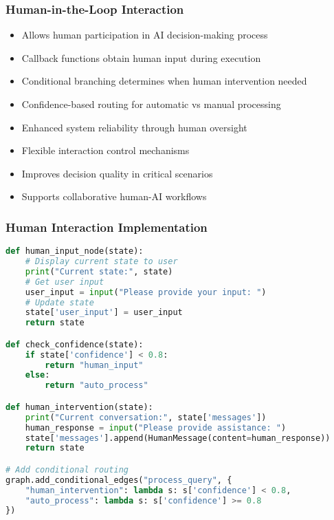 \begin{frame}[fragile]\frametitle{Human-in-the-Loop Interaction}
      \begin{itemize}
        \item Allows human participation in AI decision-making process
        \item Callback functions obtain human input during execution
        \item Conditional branching determines when human intervention needed
        \item Confidence-based routing for automatic vs manual processing
        \item Enhanced system reliability through human oversight
        \item Flexible interaction control mechanisms
        \item Improves decision quality in critical scenarios
        \item Supports collaborative human-AI workflows
      \end{itemize}
\end{frame}

\begin{frame}[fragile]\frametitle{Human Interaction Implementation}
      \begin{lstlisting}[language=Python, basicstyle=\tiny]
def human_input_node(state):
    # Display current state to user
    print("Current state:", state)
    # Get user input
    user_input = input("Please provide your input: ")
    # Update state
    state['user_input'] = user_input
    return state

def check_confidence(state):
    if state['confidence'] < 0.8:
        return "human_input"
    else:
        return "auto_process"

def human_intervention(state):
    print("Current conversation:", state['messages'])
    human_response = input("Please provide assistance: ")
    state['messages'].append(HumanMessage(content=human_response))
    return state

# Add conditional routing
graph.add_conditional_edges("process_query", {
    "human_intervention": lambda s: s['confidence'] < 0.8,
    "auto_process": lambda s: s['confidence'] >= 0.8
})
      \end{lstlisting}
\end{frame}

